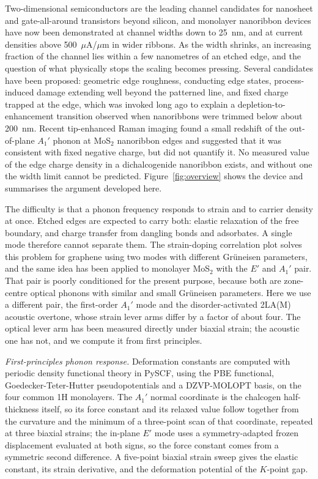 \documentclass[aip,apl,amsmath,amssymb,reprint,longbibliography]{revtex4-1}
\begin{document}
Two-dimensional semiconductors are the leading channel candidates for
nanosheet and gate-all-around transistors beyond
silicon,\cite{Pal2024,Yin2024,Tang2025,Kim2025} and monolayer nanoribbon
devices have now been demonstrated at channel widths down to 25~nm, and at
current densities above 500~$\mu$A/$\mu$m in wider ribbons.\cite{Pena2026} As the width
shrinks, an increasing fraction of the channel lies within a few nanometres of
an etched edge, and the question of what physically stops the scaling becomes
pressing. Several candidates have been proposed: geometric edge roughness,
conducting edge states,\cite{Wu2016} process-induced damage extending well
beyond the patterned line,\cite{LiuHIM2025} and fixed charge trapped at the
edge, which was invoked long ago to explain a depletion-to-enhancement
transition observed when nanoribbons were trimmed below about
200~nm.\cite{LiuEDL2012} Recent tip-enhanced Raman imaging found a small
redshift of the out-of-plane $A_1'$ phonon at MoS$_2$ nanoribbon edges and
suggested that it was consistent with fixed negative charge, but did not
quantify it.\cite{Krayev2026} No measured value of the edge charge density in
a dichalcogenide nanoribbon exists, and without one the width limit cannot be
predicted. Figure~\ref{fig:overview} shows the device and summarises the
argument developed here.

The difficulty is that a phonon frequency responds to strain and to carrier
density at once. Etched edges are expected to carry both: elastic relaxation
of the free boundary, and charge transfer from dangling bonds and adsorbates.
A single mode therefore cannot separate them. The strain-doping correlation
plot solves this problem for graphene using two modes with different
Gr\"uneisen parameters,\cite{Lee2012graphene} and the same idea has been
applied to monolayer MoS$_2$ with the $E'$ and $A_1'$
pair.\cite{Michail2016} That pair is poorly conditioned for the present
purpose, because both are zone-centre optical phonons with similar and small
Gr\"uneisen parameters. Here we use a different pair, the first-order $A_1'$
mode and the disorder-activated 2LA(M) acoustic overtone, whose strain lever
arms differ by a factor of about four. The optical lever arm has been measured
directly under biaxial strain; the acoustic one has not, and we compute it
from first principles.

\emph{First-principles phonon response.} Deformation constants are computed
with periodic density functional theory in PySCF,\cite{Sun2020} using the PBE
functional,\cite{Perdew1996} Goedecker-Teter-Hutter
pseudopotentials\cite{Goedecker1996,Hartwigsen1998} and a DZVP-MOLOPT
basis,\cite{VandeVondele2007} on the four common 1H monolayers. The $A_1'$
normal coordinate is the chalcogen half-thickness itself, so its force
constant and its relaxed value follow together from the curvature and the
minimum of a three-point scan of that coordinate, repeated at three biaxial
strains; the in-plane $E'$ mode uses a symmetry-adapted frozen displacement
evaluated at both signs, so the force constant comes from a symmetric second
difference. A five-point biaxial strain sweep gives the elastic constant, its
strain derivative, and the deformation potential of the $K$-point gap.
\end{document}
